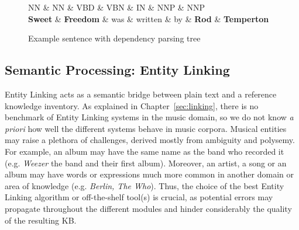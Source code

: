 \begin{figure}[!htb]
\centering
\begin{dependency}
\begin{deptext}[column sep=.0cm]
NN \& NN \& VBD \& VBN \& IN \& NNP \& NNP \\
\textbf{Sweet} \& \textbf{Freedom} \& was \& written \& by \& \textbf{Rod} \& \textbf{Temperton} \\
\end{deptext}




\end{dependency}
\vspace*{-5mm}
\caption{Example sentence with dependency parsing tree}
\label{fig:kb:sampletree}
\end{figure}


\subsection{Semantic Processing: Entity Linking}
\label{sec:kb:method:entitylinking}

Entity Linking acts as a semantic bridge between plain text and a reference knowledge inventory. %
As explained in Chapter~\ref{sec:linking}, there is no benchmark of Entity Linking systems in the music domain, so we do not know \textit{a priori} how well the different systems behave in music corpora. Musical entities may raise a plethora of challenges, derived mostly from ambiguity and polysemy. For example, an album may have the same name as the band who recorded it (e.g. \textit{Weezer} the band and their first album). Moreover, an artist, a song or an album may have words or expressions much more common in another domain or area of knowledge (e.g. \textit{Berlin, The Who}). Thus, the choice of the best Entity Linking algorithm or off-the-shelf tool(s) is crucial, as potential errors may propagate throughout the different modules and hinder considerably the quality of the resulting KB.

